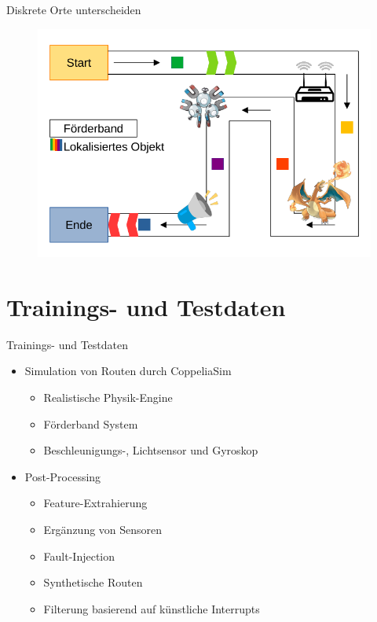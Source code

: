 \documentclass[10pt]{beamer}
\begin{document}
\begin{frame}{Diskrete Orte unterscheiden}
    \begin{figure}
        \centering
        \includegraphics[width=\linewidth]{setting_complex.png}
    \end{figure}
\end{frame}

\section{Trainings- und Testdaten}
\begin{frame}{Trainings- und Testdaten}
\begin{itemize}
    \item Simulation von Routen durch CoppeliaSim
    \begin{itemize}
        \item Realistische Physik-Engine
        \item Förderband System
        \item Beschleunigungs-, Lichtsensor und Gyroskop
    \end{itemize}
    \item Post-Processing
    \begin{itemize}
        \item Feature-Extrahierung
        \color{red}
        \item Ergänzung von Sensoren
        \item Fault-Injection
        \item Synthetische Routen
        \item Filterung basierend auf künstliche Interrupts
    \end{itemize}
\end{itemize}
\end{frame}
\end{document}
